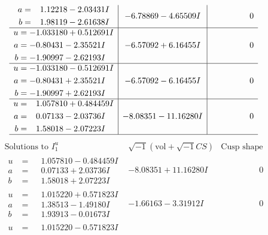 \documentclass[1p]{elsarticle_modified}
\theoremstyle{definition}
\newcommand{\I}{\sqrt{-1}}
\begin{document}
$$\begin{array}{c|c|c}
\begin{aligned}
a &= \phantom{-}1.12218 - 2.03431 I \\
b &= \phantom{-}1.98119 - 2.61638 I\end{aligned}
 & -6.78869 - 4.65509 I & \phantom{-0.000000 } 0 \\ \hline\begin{aligned}
u &= -1.033180 + 0.512691 I \\
a &= -0.80431 - 2.35521 I \\
b &= -1.90997 - 2.62193 I\end{aligned}
 & -6.57092 + 6.16455 I & \phantom{-0.000000 } 0 \\ \hline\begin{aligned}
u &= -1.033180 - 0.512691 I \\
a &= -0.80431 + 2.35521 I \\
b &= -1.90997 + 2.62193 I\end{aligned}
 & -6.57092 - 6.16455 I & \phantom{-0.000000 } 0 \\ \hline\begin{aligned}
u &= \phantom{-}1.057810 + 0.484459 I \\
a &= \phantom{-}0.07133 - 2.03736 I \\
b &= \phantom{-}1.58018 - 2.07223 I\end{aligned}
 & -8.08351 - 11.16280 I & \phantom{-0.000000 } 0\\
 \hline 
 \end{array}$$\newpage$$\begin{array}{c|c|c}  
\text{Solutions to }I^u_{1}& \I (\text{vol} + \sqrt{-1}CS) & \text{Cusp shape}\\
 \hline 
\begin{aligned}
u &= \phantom{-}1.057810 - 0.484459 I \\
a &= \phantom{-}0.07133 + 2.03736 I \\
b &= \phantom{-}1.58018 + 2.07223 I\end{aligned}
 & -8.08351 + 11.16280 I & \phantom{-0.000000 } 0 \\ \hline\begin{aligned}
u &= \phantom{-}1.015220 + 0.571823 I \\
a &= \phantom{-}1.38513 - 1.49180 I \\
b &= \phantom{-}1.93913 - 0.01673 I\end{aligned}
 & -1.66163 - 3.31912 I & \phantom{-0.000000 } 0 \\ \hline\begin{aligned}
u &= \phantom{-}1.015220 - 0.571823 I \\

\end{aligned}
\end{array}$$
\end{document}
